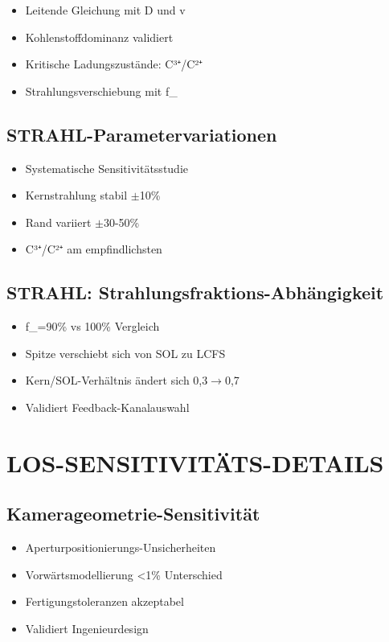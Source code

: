 \documentclass[11pt,a4paper]{article}
\begin{document}
\begin{itemize}
\item Leitende Gleichung mit D und v
\item Kohlenstoffdominanz validiert
\item Kritische Ladungszustände: C³⁺/C²⁺
\item Strahlungsverschiebung mit f_{}
\end{itemize}

\subsection{STRAHL-Parametervariationen}

\begin{itemize}
\item Systematische Sensitivitätsstudie
\item Kernstrahlung stabil $\pm$10\%
\item Rand variiert $\pm$30-50\%
\item C³⁺/C²⁺ am empfindlichsten
\end{itemize}

\subsection{STRAHL: Strahlungsfraktions-Abhängigkeit}

\begin{itemize}
\item f_{}=90\% vs 100\% Vergleich
\item Spitze verschiebt sich von SOL zu LCFS
\item Kern/SOL-Verhältnis ändert sich 0,3$\rightarrow$0,7
\item Validiert Feedback-Kanalauswahl
\end{itemize}

\section{LOS-SENSITIVITÄTS-DETAILS}

\subsection{Kamerageometrie-Sensitivität}

\begin{itemize}
\item Aperturpositionierungs-Unsicherheiten
\item Vorwärtsmodellierung <1\% Unterschied
\item Fertigungstoleranzen akzeptabel
\item Validiert Ingenieurdesign
\end{itemize}
\end{document}
